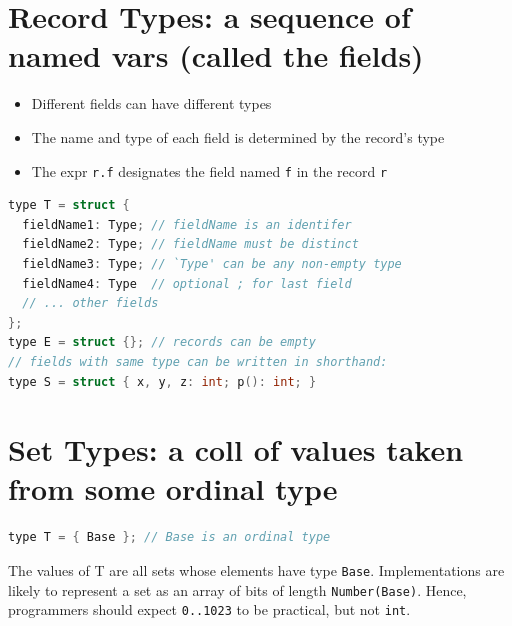 \documentclass[10pt,a4paper,landscape]{article}
\begin{document}
\begin{multicols*}{3}
\section*{Record Types: a sequence of named vars (called the fields)}
\begin{itemize}
\item Different fields can have different types
\item The name and type of each field is  determined by the record's type
\item The expr \texttt{r.f} designates the field named \texttt{f} in the record \texttt{r}
\end{itemize}
\begin{lstlisting}[language=c]
type T = struct {
  fieldName1: Type; // fieldName is an identifer
  fieldName2: Type; // fieldName must be distinct
  fieldName3: Type; // `Type' can be any non-empty type
  fieldName4: Type  // optional ; for last field
  // ... other fields
};
type E = struct {}; // records can be empty
// fields with same type can be written in shorthand:
type S = struct { x, y, z: int; p(): int; }
\end{lstlisting}
\section*{Set Types: a coll of values taken from some ordinal type}
\begin{lstlisting}[language=c]
type T = { Base }; // Base is an ordinal type
\end{lstlisting}
The values of T are all sets whose elements have type \texttt{Base}. Implementations are likely to represent a set as an array of bits of length \texttt{Number(Base)}. Hence, programmers should expect \texttt{{0..1023}} to be practical, but not \texttt{{int}}.
\end{multicols*}
\end{document}
